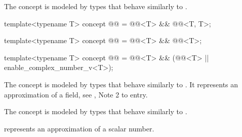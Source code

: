 \begin{itemdescr}
\pnum
\begin{note}
The  concept is modeled by types
that behave similarly to .
\end{note}
\end{itemdescr}

\begin{itemdecl}
template<typename T>
concept @@ = @@<T> && @@<T, T>;

template<typename T>
concept @@ = @@<T> && @@<T>;

template<typename T>
concept @@ = @@<T> && (@@<T> || enable_complex_number_v<T>);
\end{itemdecl}

\begin{itemdescr}
\pnum
\begin{note}
The  concept is modeled by types
that behave similarly to .
It represents an approximation of a field, see , Note 2 to entry.
\end{note}

\pnum
\begin{note}
The  concept is modeled by types
that behave similarly to .
\end{note}

\pnum
\begin{note}
 represents an approximation of a scalar number.
\end{note}
\end{itemdescr}

